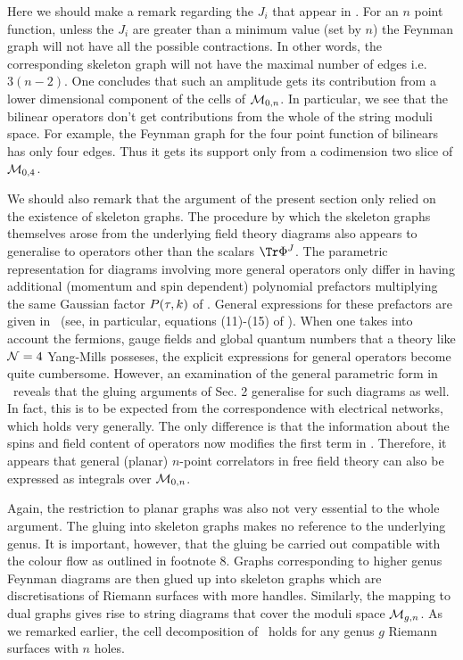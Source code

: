 Here we should make a remark regarding the $J_i$ that appear in
\ncorr . For an $n$ point function, unless the $J_i$ are greater
than a minimum value (set by $n$) the Feynman graph will not have
all the possible contractions. In other words, the corresponding
skeleton graph will not have the maximal number of edges i.e.
$3(n-2)$. One concludes that such an amplitude gets its
contribution from a lower dimensional component of the cells of
${\cal M}_{0,n}$. In particular, we see that the bilinear
operators don't get contributions from the whole of the string
moduli space. For example, the Feynman graph for the four point
function of bilinears has only four edges. Thus it gets its support only from
a codimension two slice of ${\cal M}_{0,4}$.


We should also remark that the argument of the present section
only relied on the existence of skeleton graphs. The procedure by
which the skeleton graphs themselves arose from the underlying
field theory diagrams also appears to generalise to operators
other than the scalars $\Tr\P^J$. The parametric
representation for diagrams involving more general operators only
differ in having additional (momentum and spin dependent) polynomial
prefactors multiplying the same Gaussian factor $P({\tau},k)$ of \gauss . General
expressions for these prefactors are given in \lam\lama\ (see, in particular, 
equations (11)-(15) of \lam). When one takes into 
account the fermions, gauge fields and global quantum numbers that 
a theory like ${\cal N}=4$ Yang-Mills posseses, the explicit expressions 
for general operators become quite cumbersome. However, 
an examination of the general parametric form in \lam\ reveals that the 
gluing arguments of Sec. 2 generalise for such diagrams as well.
In fact, this is to be expected from the correspondence with
electrical networks, which holds very generally. The only difference is 
that the information about the spins and field content of operators 
now modifies the first term in \fincont . 
Therefore, it appears that 
general (planar) $n$-point correlators in free field
theory can also be expressed as integrals over ${\cal M}_{0,n}$.

Again, the restriction to planar graphs was also not very
essential to the whole argument. The gluing into skeleton graphs
makes no reference to the underlying genus. It is important, however, 
that the gluing be carried out compatible with the colour flow as outlined 
in footnote 8.
Graphs corresponding
to higher genus Feynman diagrams are then glued up into skeleton graphs
which are discretisations of Riemann surfaces with more handles.
Similarly, the mapping to dual graphs gives rise to string
diagrams that cover the moduli space ${\cal M}_{g,n}$. As we
remarked earlier, the cell decomposition of \gmw\zwie\penn\ holds
for any genus $g$ Riemann surfaces with $n$ holes.

